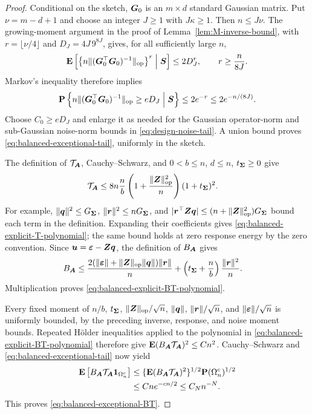 \documentclass{article}
\theoremstyle{plain} %
\theoremstyle{definition} %
\theoremstyle{definition} %
\begin{document}
\begin{proof}
Conditional on the sketch, $\boldsymbol{G}_0$ is an $m\times d$ standard Gaussian
matrix. Put $\nu=m-d+1$ and choose an integer $J\geq1$ with $J\kappa\geq1$.
Then $n\leq J\nu$. The growing-moment argument in the proof of
Lemma~\ref{lem:M-inverse-bound}, with
$r=\lfloor\nu/4\rfloor$ and
$D_J=4J\,9^{8J}$, gives, for all sufficiently large $n$,
\begin{align*}
    {\mathbf{E}}\left[
       \left\{n\lVert(\boldsymbol{G}_0^\top\boldsymbol{G}_0)^{-1}\rVert_{\rm op}\right\}^{r}
       \mathrel{\Big|}\boldsymbol{S}\right]
       \leq 2D_J^r,
    \qquad r\geq\frac{n}{8J}.
\end{align*}
Markov's inequality therefore implies
\begin{align*}
    {\mathbf{P}}\left\{
       n\lVert(\boldsymbol{G}_0^\top\boldsymbol{G}_0)^{-1}\rVert_{\rm op}\geq eD_J
       \mathrel{\Big|}\boldsymbol{S}\right\}
       \leq2e^{-r}\leq2e^{-n/(8J)}.
\end{align*}
Choose $C_0\geq eD_J$ and enlarge it as needed for the Gaussian operator-norm
and sub-Gaussian noise-norm bounds in \eqref{eq:design-noise-tail}.
A union bound proves \eqref{eq:balanced-exceptional-tail}, uniformly in
the sketch.

The definition of $\mathcal T_{\boldsymbol{A}}$, Cauchy--Schwarz, and
$0<b\leq n$, $d\leq n$, $t_{\boldsymbol{\Sigma}}\geq0$ give
\begin{align}
    \mathcal T_{\boldsymbol{A}}
    &\leq 8n\frac nb
       \left(1+\frac{\lVert\boldsymbol{Z}\rVert_{\rm op}^2}{n}\right)
       (1+t_{\boldsymbol{\Sigma}})^2.
    \label{eq:balanced-explicit-T-polynomial}
\end{align}
For example, $\lVert\boldsymbol{q}\rVert^2\leq G_{\boldsymbol{\Sigma}}$,
$\lVert\boldsymbol{r}\rVert^2\leq nG_{\boldsymbol{\Sigma}}$, and
$|\boldsymbol{r}^\top\boldsymbol{Z}\boldsymbol{q}|\leq(n+\lVert\boldsymbol{Z}\rVert_{\rm op}^2)G_{\boldsymbol{\Sigma}}$
bound each term in the definition. Expanding their coefficients gives
\eqref{eq:balanced-explicit-T-polynomial}; the same bound holds at zero
response energy by the zero convention.
Since $\boldsymbol{u}={\boldsymbol{\varepsilon} }-\boldsymbol{Z}\boldsymbol{q}$, the definition of $B_{\boldsymbol{A}}$ gives
\begin{align*}
    B_{\boldsymbol{A}}
    &\leq
       \frac{2(\lVert{\boldsymbol{\varepsilon} }\rVert+\lVert\boldsymbol{Z}\rVert_{\rm op}\lVert\boldsymbol{q}\rVert)\lVert\boldsymbol{r}\rVert}{n}
       +\left(t_{\boldsymbol{\Sigma}}+\frac nb\right)\frac{\lVert\boldsymbol{r}\rVert^2}{n}.
\end{align*}
Multiplication proves \eqref{eq:balanced-explicit-BT-polynomial}.

Every fixed moment of $n/b$, $t_{\boldsymbol{\Sigma}}$,
$\lVert\boldsymbol{Z}\rVert_{\rm op}/\sqrt n$, $\lVert\boldsymbol{q}\rVert$,
$\lVert\boldsymbol{r}\rVert/\sqrt n$, and $\lVert{\boldsymbol{\varepsilon} }\rVert/\sqrt n$ is uniformly bounded,
by the preceding inverse, response, and noise moment bounds.
Repeated H\"older inequalities applied to the polynomial in
\eqref{eq:balanced-explicit-BT-polynomial} therefore give
${\mathbf{E}}(B_{\boldsymbol{A}}\mathcal T_{\boldsymbol{A}})^2\leq Cn^2$.
Cauchy--Schwarz and \eqref{eq:balanced-exceptional-tail} now yield
\begin{align*}
    {\mathbf{E}}\left[B_{\boldsymbol{A}}\mathcal T_{\boldsymbol{A}}
       \boldsymbol{1}_{\Omega_n^c}\right]
    &\leq \{{\mathbf{E}}(B_{\boldsymbol{A}}\mathcal T_{\boldsymbol{A}})^2\}^{1/2}
       {\mathbf{P}}(\Omega_n^c)^{1/2}\\
    &\leq Cn e^{-cn/2}\leq C_Nn^{-N}.
\end{align*}
This proves \eqref{eq:balanced-exceptional-BT}.
\end{proof}
\end{document}
